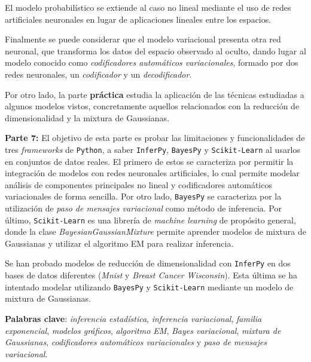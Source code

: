 El modelo probabilístico se extiende al caso no lineal mediante el uso de redes artificiales neuronales en lugar de aplicaciones lineales entre los espacios.

Finalmente se puede considerar que el modelo variacional presenta otra red neuronal, que transforma los datos del espacio observado al oculto, dando lugar al modelo conocido como \emph{codificadores automáticos variacionales}, formado por dos redes neuronales, un \emph{codificador} y un \emph{decodificador}.

Por otro lado, la parte \textbf{práctica} estudia la aplicación de las técnicas estudiadas a algunos modelos vistos, concretamente aquellos relacionados con la reducción de dimensionalidad y la mixtura de Gaussianas.

\textbf{Parte 7:} El objetivo de esta parte es probar las limitaciones y funcionalidades de tres \textit{frameworks} de \texttt{Python}, a saber \texttt{InferPy}, \texttt{BayesPy} y \texttt{Scikit-Learn} al usarlos en conjuntos de datos reales. El primero de estos se caracteriza por permitir la integración de modelos con redes neuronales artificiales, lo cual permite modelar análisis de componentes principales no lineal y codificadores automáticos variacionales de forma sencilla. Por otro lado, \texttt{BayesPy} se caracteriza por la utilización de \emph{paso de mensajes variacional} como método de inferencia. Por último, \texttt{Scikit-Learn} es una librería de \emph{machine learning} de propósito general, donde la clase \emph{BayesianGaussianMixture} permite aprender modelos de mixtura de Gaussianas y utilizar el algoritmo EM para realizar inferencia.

Se han probado modelos de reducción de dimensionalidad con \texttt{InferPy} en dos bases de datos diferentes (\emph{Mnist} y \emph{Breast Cancer Wisconsin}). Esta última se ha intentado modelar utilizando \texttt{BayesPy} y \texttt{Scikit-Learn} mediante un modelo de mixtura de Gaussianas.

\textbf{Palabras clave}: \emph{inferencia estadística}, \emph{inferencia variacional}, \emph{familia exponencial}, \emph{modelos gráficos}, \emph{algoritmo EM}, \emph{Bayes variacional}, \emph{mixtura de Gaussianas}, \emph{codificadores automáticos variacionales} y \emph{paso de mensajes variacional}.
